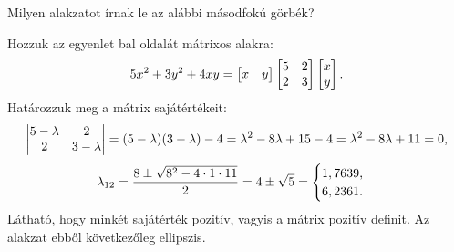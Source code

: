 \begin{exercise}{%
    Milyen alakzatot írnak le az alábbi másodfokú görbék?
  }
{\begin{enumerate}[a)]
            Hozzuk az egyenlet bal oldalát mátrixos alakra:
            \[
              5x^2 + 3y^2 + 4xy =
              \begin{bmatrix} x & y \end{bmatrix}
              \begin{bmatrix} 5 & 2 \\ 2 & 3 \end{bmatrix}
              \begin{bmatrix} x \\ y \end{bmatrix}
              \text.
            \]
            Határozzuk meg a mátrix sajátértékeit:
            \[
              \begin{vmatrix} 5 - \lambda & 2 \\ 2 & 3 - \lambda \end{vmatrix}
              = (5 - \lambda)(3 - \lambda) - 4
              = \lambda^2 - 8 \lambda + 15 - 4
              = \lambda^2 - 8 \lambda + 11
              = 0
              \text,
            \]
            \[
              \lambda_{12}
              = \frac{8 \pm \sqrt{8^2 - 4 \cdot 1 \cdot 11}}{2}
              = 4 \pm \sqrt{5}
              = \begin{cases}
                1,7639 \text, \\
                6,2361 \text.
              \end{cases}
            \]
            Látható, hogy minkét sajátérték pozitív, vagyis a mátrix pozitív
            definit. Az alakzat ebből következőleg ellipszis.
    \end{enumerate}
  }
\end{exercise}
